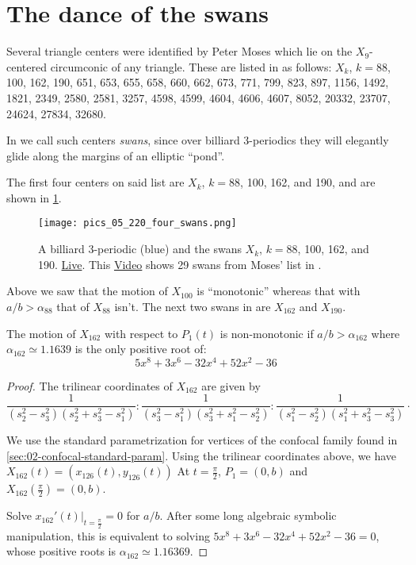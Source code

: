\section{The dance of the swans}
\label{sec:05-swans}

Several triangle centers were identified by Peter Moses which lie on the $X_9$-centered circumconic of any triangle. These are listed   in \cite[X(9)]{etc} as follows: $X_k$, $k=$88, 100, 162, 190, 651, 653, 655, 658, 660, 662, 673, 771, 799,  823, 897, 1156, 1492, 1821, 2349, 2580, 2581, 3257, 4598, 4599, 4604, 4606, 4607, 8052, 20332, 23707, 24624, 27834, 32680.

In \cite{reznik2020-ballet} we call such centers {\em swans}, since over billiard 3-periodics they will elegantly glide along the margins of an elliptic ``pond''.

The first four centers on said list are $X_k$, $k=$88, 100, 162, and 190, and are shown in \cref{fig:05-four-swans}.

\begin{figure}
    \centering
    \texttt{[image: pics\_05\_220\_four\_swans.png]}
    \caption{A billiard 3-periodic (blue) and the swans $X_k$, $k=$88, 100, 162, and 190. \href{https://bit.ly/34vwQAt}{Live}. This \href{https://youtu.be/JdcJt5PExsw}{Video} shows 29 swans from Moses' list in \cite[X(9)]{etc}.}
    \label{fig:05-four-swans}
\end{figure}

Above we saw that the motion of $X_{100}$ is ``monotonic'' whereas that with $a/b>\alpha_{88}$ that of $X_{88}$ isn't. The next two swans in \cite{etc} are $X_{162}$ and $X_{190}$. 

\begin{proposition}
\label{prop:05-x162}
The motion of $X_{162}$ with respect to $P_1(t)$ is non-monotonic if $a/b>\alpha_{162}$ where $\alpha_{162}{\simeq}1.1639$ is the only positive root of:
\[ 5 x^8 + 3 x^6 - 32 x^4 + 52 x^2 - 36 \]
\end{proposition}

\begin{proof}
The trilinear coordinates of $X_{162}$ are given by
{\small 
\[  \frac {1}{ \left( s_2^{2}-  s_3^{2} \right)  \left( s_2^{2}+ s_3^{2}-
s_1^{2} \right) } :  \frac {1}{ \left( s_3^{2}-  s_1^{2} \right)  \left( s_3^{2}+ s_1^{2} -
s_2^{2} \right) }:\frac {1}{ \left( s_1^{2}-  s_2^{2} \right)  \left( s_1^{2}+ s_3^{2} -
s_3^{2}\right) }\cdot
\]
}

We use the standard parametrization for vertices of the confocal family found in \cref{sec:02-confocal-standard-param}. Using the trilinear coordinates above, we have   $X_{162}(t)=(x_{126}(t), y_{126}(t))$ 
  At $t=\frac{\pi}{2}$, $P_1=(0,b)$ and   $X_{162}(\frac{\pi}{2})= (0,b)$.
  
  Solve $x_{162}'(t)|_{t=\frac{\pi}{2}}=0$ for $a/b$. After some long algebraic symbolic manipulation, this is equivalent to solving $5 x^8 + 3 x^6 - 32 x^4 + 52 x^2 - 36=0$, whose positive roots is $  \alpha_{162} \simeq 1.16369.$
\end{proof}


